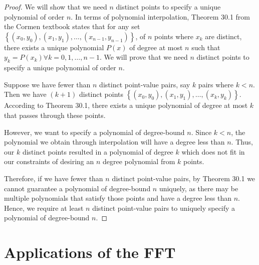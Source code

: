 \documentclass{article}
\renewcommand{\_}{\ifincsname_\else\legacyunderscore\fi}
\begin{document}
\begin{proof}
We will show that we need $n$ distinct points to specify a unique polynomial of order $n$. In terms of polynomial interpolation, Theorem 30.1 from the Cormen textbook states that for any set $\left\{ (x_0, y_0), (x_1, y_1), \hdots,(x_{n-1}, y_{n-1})\right\}$, of $n$ points where $x_k$ are distinct, there exists a unique polynomial $P(x)$ of degree at most $n$ such that $y_k=P(x_k) \forall k=0, 1, \hdots, n-1$. We will prove that we need $n$ distinct points to specify a unique polynomial of order $n$.

Suppose we have fewer than $n$ distinct point-value pairs, say $k$ pairs where $k < n$. Then we have $(k+1)$ distinct points $\left\{(x_0, y_0), (x_1, y_1), \hdots, (x_k, y_k)\right\}$. According to Theorem 30.1, there exists a unique polynomial of degree at most $k$ that passes through these points.

However, we want to specify a polynomial of degree-bound $n$. Since $k < n$, the polynomial we obtain through interpolation will have a degree less than $n$. Thus, our $k$ distinct points resulted in a polynomial of degree $k$ which does not fit in our constraints of desiring an $n$ degree polynomial from $k$ points. 

Therefore, if we have fewer than $n$ distinct point-value pairs, by Theorem 30.1 we cannot guarantee a polynomial of degree-bound $n$ uniquely, as there may be multiple polynomials that satisfy those points and have a degree less than $n$. Hence, we require at least $n$ distinct point-value pairs to uniquely specify a polynomial of degree-bound $n$.
\end{proof}

    \section*{Applications of the FFT}

\printbibliography
\end{document}
